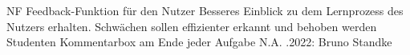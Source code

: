\begin{myreq}
    \threeinline
    {\reqno }
    {\reqtype NF}
    {}
    \reqdesc Feedback-Funktion für den Nutzer
    \reqrat Besseres Einblick zu dem Lernprozess des Nutzers erhalten. Schwächen sollen effizienter erkannt und behoben werden
    \reqorig Studenten
    \reqfit Kommentarbox am Ende jeder Aufgabe  %
    \twoinline
    {}
    {}
    \twoinline
    {}
    {\reqconf N.A.}
    \reqmater {}
    .2022: Bruno Standke
\end{myreq}
